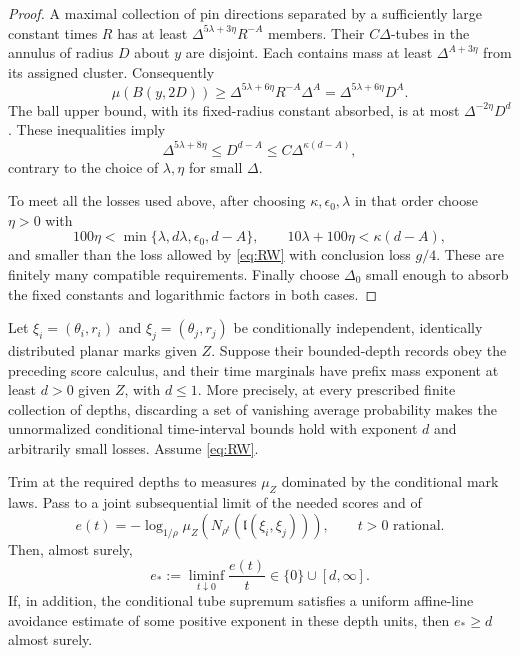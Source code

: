 \begin{proof}
A maximal collection of pin directions separated by a sufficiently
large constant times $R$ has at least
$\Delta^{5\lambda+3\eta}R^{-A}$ members.  Their
$C\Delta$-tubes in the annulus of radius $D$ about $y$ are
disjoint.  Each contains mass at least $\Delta^{A+3\eta}$
from its assigned cluster.  Consequently
\[
 \mu(B(y,2D))
   \geq \Delta^{5\lambda+6\eta}R^{-A}\Delta^A
   =\Delta^{5\lambda+6\eta}D^A.
\]
The ball upper bound, with its fixed-radius constant absorbed,
is at most $\Delta^{-2\eta}D^d$.  These inequalities imply
\[
 \Delta^{5\lambda+8\eta}
       \leq D^{d-A}
       \leq C\Delta^{\kappa(d-A)},
\]
contrary to the choice of $\lambda,\eta$ for small $\Delta$.

To meet all the losses used above, after choosing
$\kappa,\epsilon_0,\lambda$ in that order choose $\eta>0$ with
\[
 100\eta<\min\{\lambda,d\lambda,\epsilon_0,d-A\},
 \qquad 10\lambda+100\eta<\kappa(d-A),
\]
and smaller than the loss allowed by \eqref{eq:RW} with conclusion
loss $g/4$. These are finitely many compatible requirements.
Finally choose $\Delta_0$ small enough to absorb the fixed constants
and logarithmic factors in both cases.
\end{proof}

\begin{proposition}\label{names:radial-dichotomy}
Let $\xi_i=(\theta_i,r_i)$ and $\xi_j=(\theta_j,r_j)$
be conditionally independent, identically distributed planar
marks given $Z$.  Suppose their bounded-depth records obey the
preceding score calculus, and their time marginals have prefix
mass exponent at least $d>0$ given $Z$, with $d\leq1$.
More precisely, at every prescribed finite collection of depths,
discarding a set of vanishing average probability makes the
unnormalized conditional time-interval bounds hold with exponent
$d$ and arbitrarily small losses.  Assume \eqref{eq:RW}.

Trim at the required depths to measures $\mu_Z$ dominated by
the conditional mark laws.  Pass to a joint subsequential limit
of the needed scores and of
\[
 e(t)=-\log_{1/\rho}
        \mu_Z(N_{\rho^t}(\mathfrak l(\xi_i,\xi_j))),
 \qquad t>0\text{ rational}.
\]
Then, almost surely,
\begin{equation}
 e_*:=\liminf_{t\downarrow0}\frac{e(t)}{t}
          \in\{0\}\cup[d,\infty].
 \tag{rad}\label{eq:rad}
\end{equation}
If, in addition, the conditional tube supremum satisfies a
uniform affine-line avoidance estimate of some positive exponent
in these depth units, then $e_*\geq d$ almost surely.
\end{proposition}

